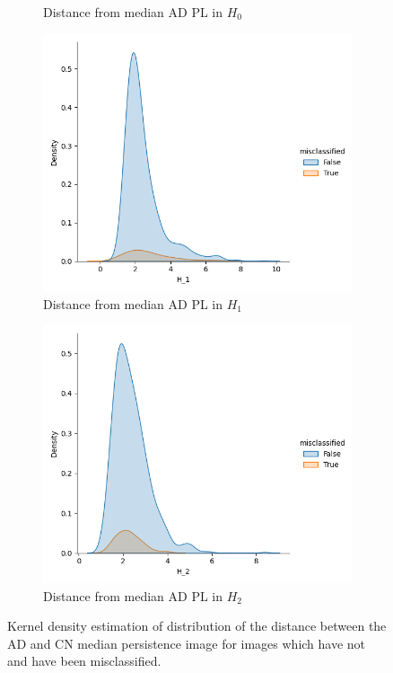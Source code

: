 \documentclass{article}
\begin{document}
\begin{figure}
\begin{subfigure}{0.32\textwidth}
    \caption{Distance from median AD PL in $H_0$}
  \end{subfigure}
  \begin{subfigure}{0.32\textwidth}
    \includegraphics[width=\textwidth]{figures/misclassification_distance/distribution_distance_misclassified_AD_H_1.png}
    \caption{Distance from median AD PL in $H_1$}
  \end{subfigure}
  \begin{subfigure}{0.32\textwidth}
    \includegraphics[width=\textwidth]{figures/misclassification_distance/distribution_distance_misclassified_AD_H_2.png}
    \caption{Distance from median AD PL in $H_2$}
  \end{subfigure}
    \caption{Kernel density estimation of distribution of the distance between the AD and CN median persistence image for images which have not and have been misclassified.}
  \label{fig:outlier_misclassified}
\end{figure}
\end{document}
